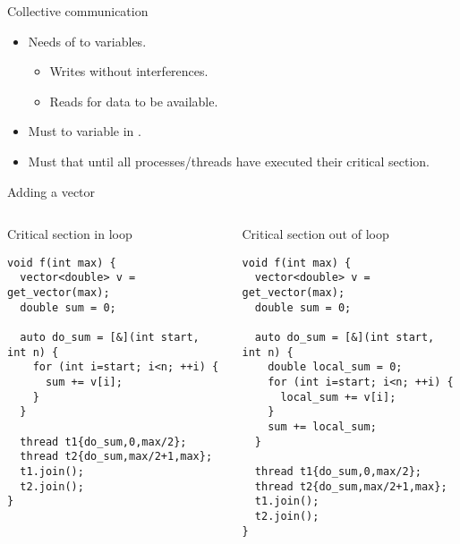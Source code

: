 \begin{frame}[t]{Collective communication}
\begin{itemize}
  \item Needs  of  to variables.
    \begin{itemize}
      \item Writes without interferences.
      \item Reads  for data to be available.
    \end{itemize}

  \item Must  to variable in .

  \item Must  that  
        until all processes/threads have executed their critical section.
  
\end{itemize}
\end{frame}

\begin{frame}[fragile]{Adding a vector}
\begin{columns}

\begin{block}{Critical section in loop}
\begin{lstlisting}
void f(int max) {
  vector<double> v = get_vector(max);
  double sum = 0;
  
  auto do_sum = [&](int start, int n) {
    for (int i=start; i<n; ++i) {
      sum += v[i];
    }
  }

  thread t1{do_sum,0,max/2};
  thread t2{do_sum,max/2+1,max};
  t1.join();
  t2.join();
}
\end{lstlisting}
\end{block}


\begin{block}{Critical section out of loop}
\begin{lstlisting}
void f(int max) {
  vector<double> v = get_vector(max);
  double sum = 0;
  
  auto do_sum = [&](int start, int n) {
    double local_sum = 0;
    for (int i=start; i<n; ++i) {
      local_sum += v[i];
    }
    sum += local_sum;
  }

  thread t1{do_sum,0,max/2};
  thread t2{do_sum,max/2+1,max};
  t1.join();
  t2.join();
}
\end{lstlisting}
\end{block}

\end{columns}
\end{frame}
